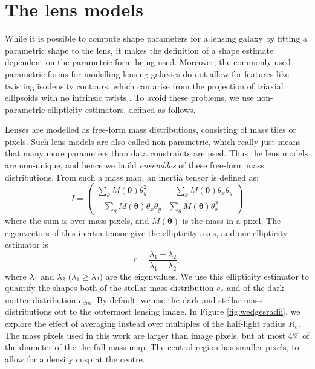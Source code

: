 \documentclass[useAMS,usenatbib]{mn2e}
\begin{document}
\section{The lens models}\label{sec:shapemethod}

While it is possible to compute shape parameters for a lensing galaxy by fitting a parametric shape to the lens, it makes the definition of a shape estimate dependent on the parametric form being used. Moreover, the commonly-used parametric forms for modelling lensing galaxies \citep[e.g.][]{2001astro.ph..2341K} do not allow for features like twisting isodensity contours, which can arise from the projection of triaxial ellipsoids with no intrinsic twists \citep[e.g.][and references therein]{1978ComAp...8...27B}. To avoid these problems, we use non-parametric ellipticity estimators, defined as follows.

Lenses are modelled as free-form mass distributions, consisting of mass tiles or pixels. Such lens models are also called non-parametric, which really just means that many more parameters than data constraints are used. Thus the lens models are non-unique, and hence we build {\it ensembles} of these free-form mass distributions. From such a mass map, an inertia tensor is defined as:
\begin{equation}\label{eq:inertiatensor}
I = 
\begin{pmatrix}
 \sum_\theta M(\boldsymbol{\theta})\theta^{2}_{y} & -\sum_\theta M(\boldsymbol{\theta})\theta_{x}\theta_{y} \\
-\sum_\theta M(\boldsymbol{\theta})\theta_{x}\theta_{y} & \sum_\theta M(\boldsymbol{\theta})\theta^{2}_{x}
\end{pmatrix}
\end{equation}
where the sum is over mass pixels, and $M(\boldsymbol{\theta})$ is the mass in a pixel. The eigenvectors of this inertia tensor give the ellipticity axes, and our ellipticity estimator is
\begin{equation}\label{eq:shapeestimate}
    e \equiv \frac{\lambda_{1}-\lambda_{2}}{\lambda_{1}+\lambda_{2}},
\end{equation}
where $\lambda_{1}$ and $\lambda_{2}$ ($\lambda_{1} \geq \lambda_{2}$) are the eigenvalues. We use this ellipticity estimator to quantify the shapes both of the stellar-mass distribution $e_*$ and of the dark-matter distribution $e_{dm}$. By default, we use the dark and stellar mass distributions out to the outermost lensing image. In Figure \ref{fig:wedgesradii}, we explore the effect of averaging instead over multiples of the half-light radius $R_e$. The mass pixels used in this work are larger than image pixels, but at most 4\% of the diameter of the the full mass map. The central region has smaller pixels, to allow for a density cusp at the centre.
\end{document}
